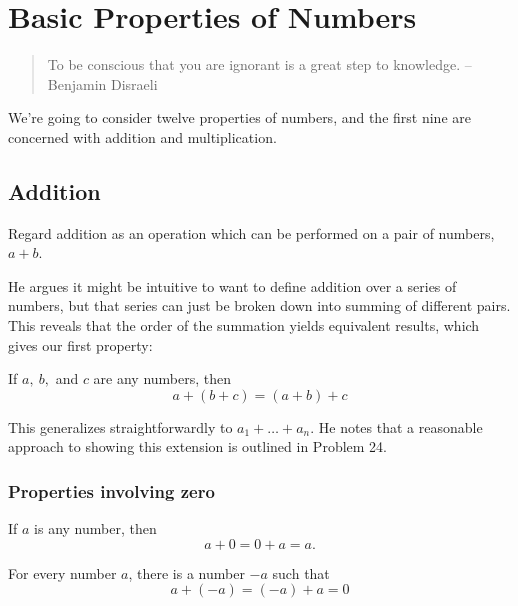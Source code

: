 \chapter{Basic Properties of Numbers}

\begin{quote}
    To be conscious that you are ignorant is a great step to knowledge.
    \hfill -- Benjamin Disraeli
\end{quote}

We're going to consider twelve properties of numbers, and the first nine are concerned
with addition and multiplication.

\section{Addition}

\begin{definition}
    Regard addition as an operation which can be performed on a pair of numbers, $a + b$.
\end{definition}

He argues it might be intuitive to want to define addition over a series of numbers, but
that series can just be broken down into summing of different pairs. This reveals that the
order of the summation yields equivalent results, which gives our first property:

\begin{property}
    If $a,~b,$ and $c$ are any numbers, then
    $$
    a + (b + c) = (a + b) + c
    $$
\end{property}

This generalizes straightforwardly to $a_1 + \ldots + a_n$. He notes that a reasonable
approach to showing this extension is outlined in Problem 24. 

\subsection{Properties involving zero}

\begin{property}\label{prop:additiveidentity}
    If $a$ is any number, then 
    $$
    a + 0 = 0 + a = a.
    $$
\end{property}

\begin{property}
    For every number $a$, there is a number $-a$ such that
    $$
    a + (-a) = (-a) + a = 0
    $$
\end{property}

